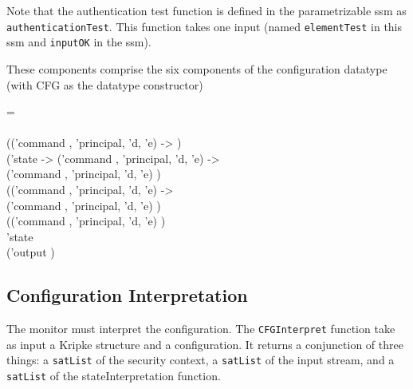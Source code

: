 \documentclass[../../main/main.tex]{subfiles}
\begin{document}
Note that the authentication test function is defined in the parametrizable ssm as \texttt{authenticationTest}.  This function takes one input (named \texttt{elementTest} in this ssm and \texttt{inputOK} in the \gls{ssm}).

These components comprise the six components of the configuration datatype (with CFG as the datatype constructor)

\begin{tabbing}
\parskip=8pt
 = \\
\hspace{0.3cm}     \\
\hspace{0.5cm}  (('command , 'principal, 'd, 'e)  -> )\\
\hspace{0.5cm}    ('state -> ('command , 'principal, 'd, 'e)   -> \\
\hspace{0.5cm}    ('command , 'principal, 'd, 'e)  ) \\
 \hspace{0.5cm}   (('command , 'principal, 'd, 'e)   -> \\
\hspace{0.5cm}    ('command , 'principal, 'd, 'e)  ) \\
 \hspace{0.5cm}  (('command , 'principal, 'd, 'e)   ) \\
\hspace{0.5cm}   'state \\
\hspace{0.5cm} ('output )
\parskip=18pt
\end{tabbing}

\subsection{Configuration Interpretation}
The monitor must interpret the configuration.  The \texttt{CFGInterpret} function take as input a Kripke structure and a configuration.  It returns a conjunction of three things: a \texttt{satList} of the security context, a \texttt{satList} of the input stream, and a \texttt{satList} of the stateInterpretation function.  
\end{document}
